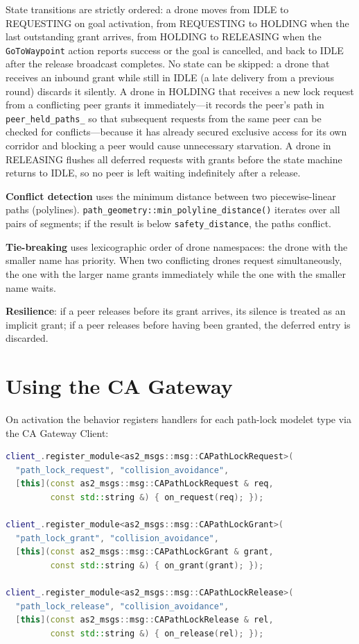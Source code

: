 \documentclass[deliverable]{csreport}
\renewcommand{\code}[1]{\texttt{\textcolor{CSMaroon}{#1}}}%
\begin{document}
State transitions are strictly ordered: a drone moves from IDLE to REQUESTING on goal activation, from REQUESTING to HOLDING when the last outstanding grant arrives, from HOLDING to RELEASING when the \code{GoToWaypoint} action reports success or the goal is cancelled, and back to IDLE after the release broadcast completes. No state can be skipped: a drone that receives an inbound grant while still in IDLE (a late delivery from a previous round) discards it silently. A drone in HOLDING that receives a new lock request from a conflicting peer grants it immediately---it records the peer's path in \code{peer\_held\_paths\_} so that subsequent requests from the same peer can be checked for conflicts---because it has already secured exclusive access for its own corridor and blocking a peer would cause unnecessary starvation. A drone in RELEASING flushes all deferred requests with grants before the state machine returns to IDLE, so no peer is left waiting indefinitely after a release.

\textbf{Conflict detection} uses the minimum distance between two piecewise-linear paths (polylines). \code{path\_geometry::min\_polyline\_distance()} iterates over all pairs of segments; if the result is below \code{safety\_distance}, the paths conflict.

\textbf{Tie-breaking} uses lexicographic order of drone namespaces: the drone with the smaller name has priority. When two conflicting drones request simultaneously, the one with the larger name grants immediately while the one with the smaller name waits.

\textbf{Resilience}: if a peer releases before its grant arrives, its silence is treated as an implicit grant; if a peer releases before having been granted, the deferred entry is discarded.

\section{Using the CA Gateway}

On activation the behavior registers handlers for each path-lock modelet type via the CA Gateway Client:

\begin{lstlisting}[language=C++, style=cppcolors,caption={Registering path-lock modelet handlers}]
client_.register_module<as2_msgs::msg::CAPathLockRequest>(
  "path_lock_request", "collision_avoidance",
  [this](const as2_msgs::msg::CAPathLockRequest & req,
         const std::string &) { on_request(req); });

client_.register_module<as2_msgs::msg::CAPathLockGrant>(
  "path_lock_grant", "collision_avoidance",
  [this](const as2_msgs::msg::CAPathLockGrant & grant,
         const std::string &) { on_grant(grant); });

client_.register_module<as2_msgs::msg::CAPathLockRelease>(
  "path_lock_release", "collision_avoidance",
  [this](const as2_msgs::msg::CAPathLockRelease & rel,
         const std::string &) { on_release(rel); });
\end{lstlisting}
\end{document}
